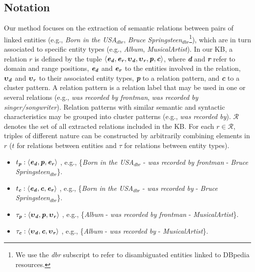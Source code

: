 \subsection{Notation}

Our method focuses on the extraction of semantic relations between pairs of linked entities (e.g., \textit{Born in the USA}$_{dbr}$, \textit{Bruce Springsteen}$_{dbr}$\footnote{We use the \textit{dbr} subscript to refer to disambiguated entities linked to DBpedia resources.}), which are in turn associated to specific entity types (e.g., \textit{Album}, \textit{MusicalArtist}). In our KB, a relation $r$ is defined by the tuple $\langle \textbf{\textit{e}}{_\textbf{\textit{d}}},
\textbf{\textit{e}}{_\textbf{\textit{r}}},
\boldsymbol\upsilon{_\textbf{\textit{d}}},
\boldsymbol\upsilon{_\textbf{\textit{r}}},
\textbf{\textit{p}}, \textbf{\textit{c}}\rangle$, where \textbf{\textit{d}} and \textbf{\textit{r}} refer to domain and range positions, $\textbf{\textit{e}}{_\textbf{\textit{d}}}$ and $\textbf{\textit{e}}{_\textbf{\textit{r}}}$ to the entities involved in the relation, $\boldsymbol\upsilon{_\textbf{\textit{d}}}$ and
$\boldsymbol\upsilon{_\textbf{\textit{r}}}$ to their associated entity types, \textbf{\textit{p}} to a relation pattern, and \textbf{\textit{c}} to a cluster pattern.  
A relation pattern is a relation label that may be used in one or several relations (e.g., \textit{was recorded by frontman}, \textit{was recorded by singer/songwriter}). Relation patterns with similar semantic and syntactic characteristics may be grouped into cluster patterns (e.g., \textit{was recorded by}). 
$\mathcal{R}$ denotes the set of all extracted relations included in the KB.
For each $r \in \mathcal{R}$, triples of different nature can be constructed by arbitrarily combining elements in $r$ ($t$ for relations between entities and $\tau$ for relations between entity types). 

\begin{itemize}
    \item $t_\textbf{\textit{p}}: \langle \textbf{\textit{e}}{_\textbf{\textit{d}}},\textbf{\textit{p}},\textbf{\textit{e}}{_\textbf{\textit{r}}} \rangle$ , e.g., \{\textit{Born in the USA}$_{dbr}$ - \textit{was recorded by frontman} - \textit{Bruce Springsteen}$_{dbr}$\}.
    \item $t_\textbf{\textit{c}}: \langle \textbf{\textit{e}}{_\textbf{\textit{d}}},\textbf{\textit{c}},\textbf{\textit{e}}{_\textbf{\textit{r}}} \rangle$ , e.g., \{\textit{Born in the USA}$_{dbr}$ - \textit{was recorded by} - \textit{Bruce Springsteen}$_{dbr}$\}.
    \item $\tau_\textbf{\textit{p}}: \langle \boldsymbol\upsilon{_\textbf{\textit{d}}},\textbf{\textit{p}},\boldsymbol\upsilon{_\textbf{\textit{r}}} \rangle$ , e.g., \{\textit{Album} - \textit{was recorded by frontman} - \textit{MusicalArtist}\}.
    \item $\tau_\textbf{\textit{c}}: \langle \boldsymbol\upsilon{_\textbf{\textit{d}}},\textbf{\textit{c}},\boldsymbol\upsilon{_\textbf{\textit{r}}} \rangle$ , e.g., \{\textit{Album} - \textit{was recorded by} - \textit{MusicalArtist}\}.
\end{itemize}

